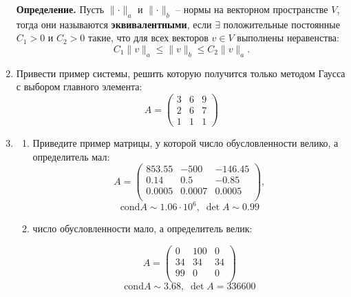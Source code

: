 \documentclass[12pt, a4paper]{article}
\newcommand{\norm}[1]{\lVert #1 \rVert}
\begin{document}
\begin{enumerate}
	\textbf{Определение.} Пусть $\norm{\cdot}_a$ и $\norm{\cdot}_b$ -- нормы на векторном пространстве $V$, тогда они называются \textbf{эквивалентными}, если $\exists$ положительные постоянные $C_1 > 0$ и $C_2 > 0$ такие, что для всех векторов $v \in V$ выполнены неравенства:
	\begin{equation*}
		C_1 \norm{v}_a \leq \norm{v}_b \leq C_2 \norm{v}_a.
	\end{equation*}
	
	\item Привести пример системы, решить которую получится только методом Гаусса с выбором главного элемента:
	\[A  = 
	\begin{pmatrix}
		3&6&9\\
		2&6&7\\
		1&1&1
	\end{pmatrix}
	\]
	
	\item 
	\begin{enumerate}
		\item Приведите пример матрицы, у которой число обусловленности велико, а определитель мал:
		\[
		A = \left(
		\begin{array}{ccc}
			853.55 & -500 & -146.45 \\
			0.14 & 0.5 & -0.85 \\
			0.0005 & 0.0007 & 0.0005 \\
		\end{array}
		\right)\!,
		\]
		\[
		\text{cond} A \sim 1.06 \cdot 10^6, \; \det A \sim 0.99
		\]
		\item число обусловленности мало, а определитель велик:
		
		\[
		A = \left(
		\begin{array}{ccc}
			0 & 100 & 0 \\
			34 & 34 & 34 \\
			99 & 0 & 0 \\
		\end{array}
		\right)
		\]
		\[
		\text{cond} A \sim 3.68, \; \det A = 336600
		\]
	\end{enumerate}
	\clearpage
	\end{enumerate}
	
\end{document}
